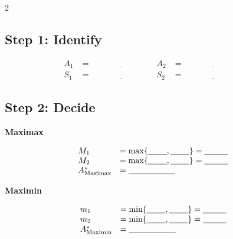 \begin{multicols}{2}
		\subsection*{Step 1: Identify}
		\[
		\begin{array}{llll}
			A_1 &= \underline{\hspace{3cm}} &
			A_2 &= \underline{\hspace{3cm}} \\[3pt]
			S_1 &= \underline{\hspace{3cm}} &
			S_2 &= \underline{\hspace{3cm}}
		\end{array}
		\]
		\subsection*{Step 2: Decide}
		
		\textbf{Maximax}
		
		\[
		\begin{array}{ll}
			M_1 &= \max\{\underline{\hspace{0.8cm}},\underline{\hspace{0.8cm}}\}
			=\underline{\hspace{1cm}} \\
			M_2 &= \max\{\underline{\hspace{0.8cm}},\underline{\hspace{0.8cm}}\}
			=\underline{\hspace{1cm}} \\
			A^*_{\mathrm{Maximax}} &= \underline{\hspace{2cm}}
		\end{array}
		\]
		
		\textbf{Maximin}
		
		\[
		\begin{array}{ll}
			m_1 &= \min\{\underline{\hspace{0.8cm}},\underline{\hspace{0.8cm}}\}
			=\underline{\hspace{1cm}} \\
			m_2 &= \min\{\underline{\hspace{0.8cm}},\underline{\hspace{0.8cm}}\}
			=\underline{\hspace{1cm}} \\
			A^*_{\mathrm{Maximin}} &= \underline{\hspace{2cm}}
		\end{array}
		\]
		

\end{multicols}

